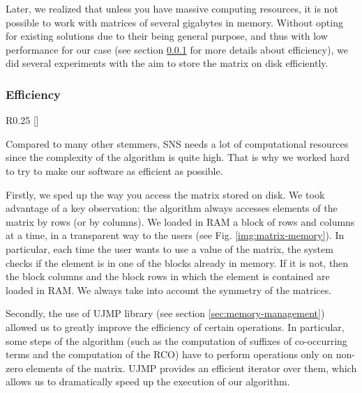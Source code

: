             Later, we realized that unless you have massive computing resources, it is not possible to work with matrices of several gigabytes in memory. Without opting for existing solutions due to their being general purpose, and thus with low performance for our case (see section \ref{sec:efficiency} for more details about efficiency), we did several experiments with the aim to store the matrix on disk efficiently.

        \subsubsection{Efficiency}\label{sec:efficiency}

            \begin{wrapfigure}{R}{0.25\textwidth}
                \centering
                \raisebox{0pt}[\dimexpr{}\baselineskip\relax]{}                
                \caption{\label{img:matrix-memory}Matrix on disk}
            \end{wrapfigure}

            Compared to many other stemmers, SNS needs a lot of computational resources since the complexity of the algorithm is quite high. That is why we worked hard to try to make our software as efficient as possible.
            
            Firstly, we sped up the way you access the matrix stored on disk. We took advantage of a key observation: the algorithm always accesses elements of the matrix by rows (or by columns). We loaded in RAM a block of rows and columns at a time, in a transparent way to the users (see Fig. \ref{img:matrix-memory}). In particular, each time the user wants to use a value of the matrix, the system checks if the element is in one of the blocks already in memory. If it is not, then the block columns and the block rows in which the element is contained are loaded in RAM. We always take into account the symmetry of the matrices.

            Secondly, the use of UJMP library (see section \ref{sec:memory-management}) allowed us to greatly improve the efficiency of certain operations. In particular, some steps of the algorithm (such as the computation of suffixes of co-occurring terms and the computation of the RCO) have to perform operations only on non-zero elements of the matrix. UJMP provides an efficient iterator over them, which allows us to dramatically speed up the execution of our algorithm.

